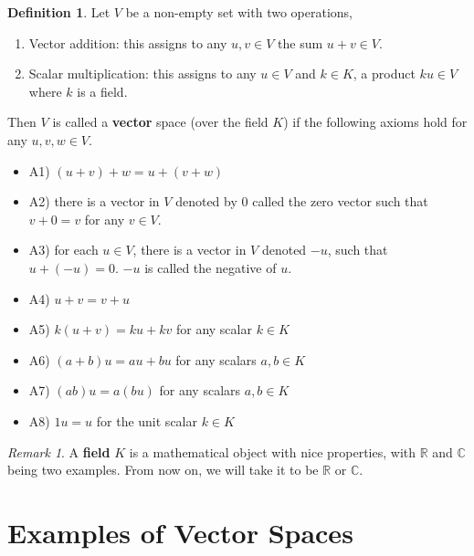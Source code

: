 \documentclass{report}
\theoremstyle{definition}
\newtheorem*{_def}{Definition}
\theoremstyle{remark}
\newtheorem{_rem}{Remark}[section]
\begin{document}
\begin{_def}

Let $V$ be a non-empty set with two operations,
\begin{enumerate}[i]
 \item Vector addition: this assigns to any $u,v\in V$ the sum $u+v\in V$.
 \item Scalar multiplication: this assigns to any $u\in V$ and $k\in K$, a product $ku\in V$ where $k$ is a field.
\end{enumerate}
Then $V$ is called a \textbf{vector} space (over the field $K$) if the following axioms hold for any $u,v,w\in V$.
\begin{itemize}
 \item A1) $(u+v)+w=u+(v+w)$
 \item A2) there is a vector in $V$ denoted by $0$ called the zero vector such that $v+0=v$ for any $v\in V$.
 \item A3) for each $u\in V$, there is a vector in $V$ denoted $-u$, such that $u+(-u)=0$.
 $-u$ is called the negative of $u$.
 \item A4) $u+v=v+u$
 \item A5) $k(u+v)=ku+kv$ for any scalar $k\in K$
 \item A6) $(a+b)u=au+bu$ for any scalars $a,b\in K$
 \item A7) $(ab)u=a(bu)$ for any scalars $a,b\in K$
 \item A8) $1u=u$ for the unit scalar $k\in K$
\end{itemize}
\end{_def}

\begin{_rem}
A \textbf{field} $K$ is a mathematical object with nice properties, with $\mathbb{R}$ and $\mathbb{C}$ being two examples. From now on, we will take it to be $\mathbb{R}$ or $\mathbb{C}$.
\end{_rem}

\section{Examples of Vector Spaces}
\end{document}
